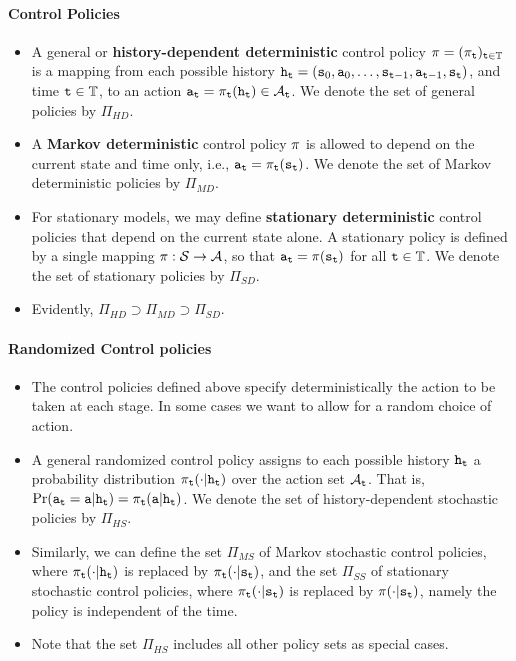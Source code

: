 \paragraph{Control Policies}
\begin{itemize}
  \item
A general or \textbf{history-dependent deterministic} control policy
$\pi  = {({\pi _{\tt t}})_{{\tt t} \in {\mathbb{T}}}}$ is a
mapping from each possible history ${{\tt h}_{\tt t}} =
({{\tt s}_0},{{\tt a}_0}, \ldots ,{{\tt s}_{{\tt t} -
1}},{{\tt a}_{{\tt t} - 1}},{{\tt s}_{\tt t}})$, and time ${\tt t} \in
\mathbb{T}$, to an action ${{\tt a}_{\tt t}} = {\pi
_{\tt t}}({{\tt h}_{\tt t}}) \in {\mathcal{A}_{\tt t}}$.  We denote the
set of general policies by ${\Pi _{HD}}$.
  \item
A \textbf{Markov deterministic} control policy $\pi $ is allowed
to depend on the current state and time only, i.e., ${{\tt a}_{\tt t}} =
{\pi _{\tt t}}({{\tt s}_{\tt t}})$.   We denote the set of Markov
deterministic policies by ${\Pi _{MD}}$.
  \item
For stationary models, we may define \textbf{stationary
deterministic} control policies that depend on the current state
alone. A stationary policy is defined by a single mapping $\pi
:\mathcal{S} \to \mathcal{A}$, so that  ${{\tt a}_{\tt t}} = \pi
({{\tt s}_{\tt t}})$ for all ${\tt t} \in {\ensuremath{\mathbb{T}}}$. We denote the set of
stationary policies by ${\Pi _{SD}}$.
  \item Evidently, ${\Pi_{HD}} \supset {\Pi_{MD}} \supset {\Pi_{SD}}$.
\end{itemize}

\paragraph{Randomized Control policies}
\begin{itemize}
  \item The control policies defined above specify deterministically the action to be taken at each stage. In some cases we want to allow for a random choice of action.
  \item A general randomized control policy assigns to each possible history ${{\tt h}_{\tt t}}$ a probability distribution ${\pi _{\tt t}}( \cdot |{{\tt h}_{\tt t}})$ over the action set ${\mathcal{A}_{\tt t}}$.
  That is,  $\Pr( {{\tt a}_{\tt t}} = {\tt a}|{{\tt h}_{\tt t}})  = {\pi _{\tt t}}({\tt a}|{{\tt h}_{\tt t}})$. We denote the set of history-dependent stochastic policies by ${\Pi _{HS}}$.
  \item Similarly, we can define the set ${\Pi _{MS}}$ of Markov stochastic control policies, where ${\pi _{\tt t}}( \cdot |{{\tt h}_{\tt t}})$ is replaced by ${\pi _{\tt t}}( \cdot |{{\tt s}_{\tt t}})$, and the set ${\Pi _{SS}}$ of stationary stochastic control policies, where ${\pi _{\tt t}}( \cdot |{{\tt s}_{\tt t}})$ is replaced by  $\pi ( \cdot
  |{{\tt s}_{\tt t}})$, namely the policy is independent of the time.
  \item Note that the set ${\Pi _{HS}}$ includes all other policy sets as special cases.
\end{itemize}

